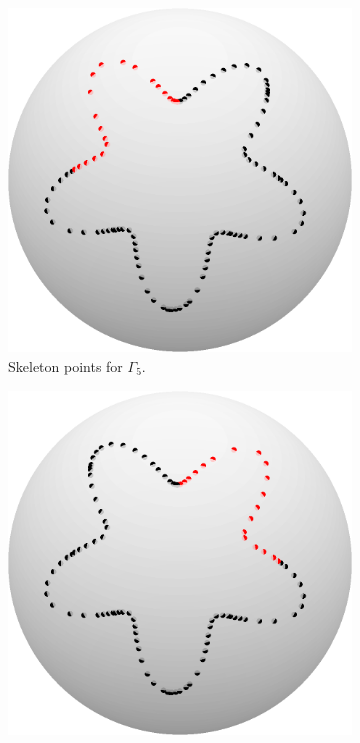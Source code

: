 \documentclass{sfuthesis}
\begin{document}
\begin{figure}[h]
	\centering
	\begin{subfigure}[b]{0.24\textwidth}
	\captionsetup{justification=centering}
		\includegraphics[width=\textwidth]{BFRecLev2Skel5}
    		\caption{Skeleton points for $\Gamma_5$.} 
       \end{subfigure}
       \quad
       \begin{subfigure}[b]{0.24\textwidth}
       \captionsetup{justification=centering}
      		\includegraphics[width=\textwidth]{BFRecLev2Skel6}

\end{subfigure}
\end{figure}
\end{document}

